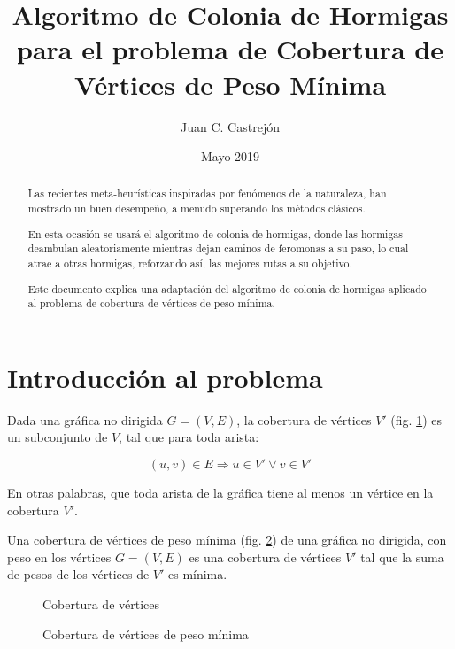 \documentclass[12pt, letterpaper]{article}
\title{Algoritmo de Colonia de Hormigas para el problema de Cobertura de Vértices de Peso Mínima}
\author{Juan C. Castrejón}
\date{Mayo 2019}
\begin{document}
\maketitle
\newcommand{\R}{\mathbb{R}}
\renewcommand{\abstractname}{Resumen}
\renewcommand{\algorithmcfname}{Procedimiento}
\renewcommand{\refname}{Referencias}
\renewcommand{\figurename}{Figura}

\begin{abstract}
Las recientes meta-heurísticas inspiradas por fenómenos de la naturaleza, han mostrado un buen desempeño, a menudo superando los métodos clásicos.
\par
En esta ocasión se usará el algoritmo de colonia de hormigas, donde las hormigas deambulan aleatoriamente mientras dejan caminos de feromonas a su paso, lo cual atrae a otras hormigas, reforzando así, las mejores rutas a su objetivo.
\par
Este documento explica una adaptación del algoritmo de colonia de hormigas aplicado al problema de cobertura de vértices de peso mínima.
\end{abstract}


\section{Introducción al problema}
Dada una gráfica no dirigida $G=(V, E)$, la cobertura de vértices $V'$ (fig. \ref{fig:1}) es un subconjunto de $V$, tal que para toda arista:

\begin{equation}
    (u,v) \in E \Rightarrow u \in V' \lor v \in V'
\end{equation}

En otras palabras, que toda arista de la gráfica tiene al menos un vértice en la cobertura $V'$.
\par
Una cobertura de vértices de peso mínima (fig. \ref{fig:2}) de una gráfica no dirigida, con peso en los vértices $G=(V, E)$ es una cobertura de vértices $V'$ tal que la suma de pesos de los vértices de $V'$ es mínima.

\begin{figure}[H]
  \centering
  
  \caption{Cobertura de vértices}
  \label{fig:1}
\end{figure}

\begin{figure}[H]
  \centering
  
  \caption{Cobertura de vértices de peso mínima}
  \label{fig:2}
\end{figure}
\end{document}
